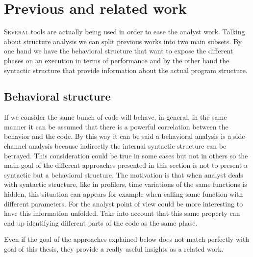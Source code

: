 \section{Previous and related work}\label{related_work}

\lettrine{S}{everal} tools are actually being used in order to ease the analyst
work. Talking about structure analysis we can split previous works into two main
subsets. By one hand we have the behavioral structure that want to expose the
different phases on an execution in terms of performance and by the other hand
the syntactic structure that provide information about the actual program
structure.

\subsection{Behavioral structure}\label{ss:behavioral_structure}

If we consider the same bunch of code will behave, in general, in the same
manner it can be assumed that there is a powerful correlation between the
behavior and the code. By this way it can be said a behavioral analysis is a
side-channel analysis because indirectly the internal syntactic structure can be
betrayed. This consideration could be true in some cases but not in others so the 
main goal of the different approaches presented in this section is not
to present a syntactic but a behavioral structure. The motivation is that when
analyst deals with syntactic structure, like in profilers, time variations of 
the same functions is
hidden, this situation can appears for example when calling same function with
different parameters. For the analyst point of view could be more interesting to
have this information unfolded. Take into account that this same property can
end up identifying different parts of the code as the same phase.

Even if the goal of the approaches explained below does not match perfectly with
goal of this thesis, they provide a really useful insights as a related work.

